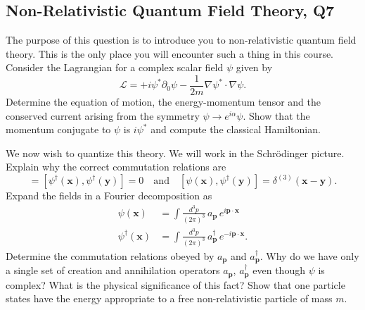 \subsection{Non-Relativistic Quantum Field Theory, Q7}

The purpose of this question is to introduce you to non-relativistic quantum field theory. This is the only place you will encounter such a thing in this course. Consider the Lagrangian for a complex scalar field $\psi$ given by
\begin{equation}
    \mathcal{L} = +i\psi^*\partial_0\psi - \frac{1}{2m}\nabla\psi^*\cdot\nabla\psi.
\end{equation}
Determine the equation of motion, the energy-momentum tensor and the conserved current arising from the symmetry $\psi\to e^{i\alpha}\psi$. Show that the momentum conjugate to $\psi$ is $i\psi^*$ and compute the classical Hamiltonian.

We now wish to quantize this theory. We will work in the Schrödinger picture. Explain why the correct commutation relations are
\begin{equation}
    [\psi(\mathbf{x}),\psi(\mathbf{y})] = [\psi^\dagger(\mathbf{x}),\psi^\dagger(\mathbf{y})] = 0 \quad \text{and} \quad [\psi(\mathbf{x}),\psi^\dagger(\mathbf{y})] = \delta^{(3)}(\mathbf{x}-\mathbf{y}).
\end{equation}
Expand the fields in a Fourier decomposition as
\begin{align}
    \psi(\mathbf{x}) &= \int\frac{d^3p}{(2\pi)^3}\,a_{\mathbf{p}}\,e^{i\mathbf{p}\cdot\mathbf{x}}\\
    \psi^\dagger(\mathbf{x}) &= \int\frac{d^3p}{(2\pi)^3}\,a_{\mathbf{p}}^\dagger\,e^{-i\mathbf{p}\cdot\mathbf{x}}.
\end{align}
Determine the commutation relations obeyed by $a_{\mathbf{p}}$ and $a_{\mathbf{p}}^\dagger$. Why do we have only a single set of creation and annihilation operators $a_{\mathbf{p}}$, $a_{\mathbf{p}}^\dagger$ even though $\psi$ is complex? What is the physical significance of this fact? Show that one particle states have the energy appropriate to a free non-relativistic particle of mass $m$.

